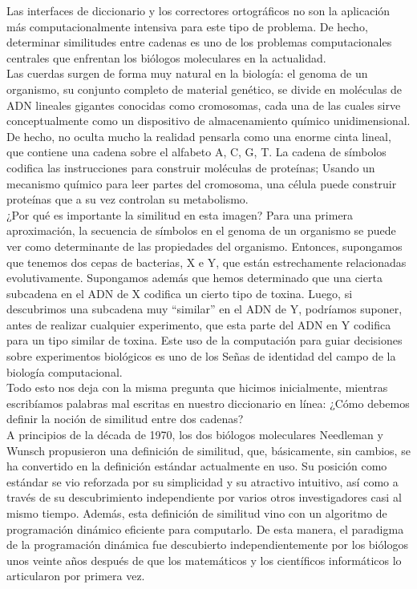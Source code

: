 \documentclass[a4paper, 12pt]{book}
\theoremstyle{dotless}
\begin{document}
Las interfaces de diccionario y los correctores ortográficos no son la aplicación más computacionalmente intensiva para este tipo de problema. De hecho, determinar similitudes entre cadenas es uno de los problemas computacionales centrales que enfrentan los biólogos moleculares en la actualidad.\\

Las cuerdas surgen de forma muy natural en la biología: el genoma de un organismo, su conjunto completo de material genético, se divide en moléculas de ADN lineales gigantes conocidas como cromosomas, cada una de las cuales sirve conceptualmente como un dispositivo de almacenamiento químico unidimensional. De hecho, no oculta mucho la realidad pensarla como una enorme cinta lineal, que contiene una cadena sobre el alfabeto {A, C, G, T}. La cadena de símbolos codifica las instrucciones para construir moléculas de proteínas; Usando un mecanismo químico para leer partes del cromosoma, una célula puede construir proteínas que a su vez controlan su metabolismo.\\

¿Por qué es importante la similitud en esta imagen? Para una primera aproximación, la secuencia de símbolos en el genoma de un organismo se puede ver como determinante de las propiedades del organismo. Entonces, supongamos que tenemos dos cepas de bacterias, X e Y, que están estrechamente relacionadas evolutivamente. Supongamos además que hemos determinado que una cierta subcadena en el ADN de X codifica un cierto tipo de toxina. Luego, si descubrimos una subcadena muy ``similar'' en el ADN de Y, podríamos suponer, antes de realizar cualquier experimento, que esta parte del ADN en Y codifica para un tipo similar de toxina. Este uso de la computación para guiar decisiones sobre experimentos biológicos es uno de los
Señas de identidad del campo de la biología computacional.\\

Todo esto nos deja con la misma pregunta que hicimos inicialmente, mientras escribíamos palabras mal escritas en nuestro diccionario en línea: ¿Cómo debemos definir la noción de similitud entre dos cadenas?\\

A principios de la década de 1970, los dos biólogos moleculares Needleman y Wunsch propusieron una definición de similitud, que, básicamente, sin cambios, se ha convertido en la definición estándar actualmente en uso. Su posición como estándar se vio reforzada por su simplicidad y su atractivo intuitivo, así como a través de su descubrimiento independiente por varios otros investigadores casi al mismo tiempo. Además, esta definición de similitud vino con un algoritmo de programación dinámico eficiente para computarlo. De esta manera, el paradigma de la programación dinámica fue descubierto independientemente por los biólogos unos veinte años después de que los matemáticos y los científicos informáticos lo articularon por primera vez.\\
\end{document}
